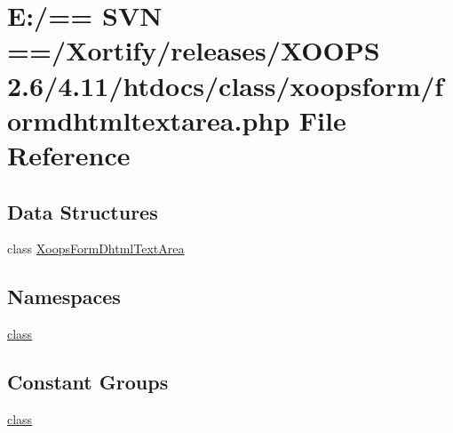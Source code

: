 \hypertarget{formdhtmltextarea_8php}{\section{E\-:/== S\-V\-N ==/\-Xortify/releases/\-X\-O\-O\-P\-S 2.6/4.11/htdocs/class/xoopsform/formdhtmltextarea.php File Reference}
\label{formdhtmltextarea_8php}
}
\subsection*{Data Structures}
\begin{DoxyCompactItemize}
\item 
class \hyperlink{class_xoops_form_dhtml_text_area}{Xoops\-Form\-Dhtml\-Text\-Area}
\end{DoxyCompactItemize}
\subsection*{Namespaces}
\begin{DoxyCompactItemize}
\item 
\hyperlink{namespaceclass}{class}
\end{DoxyCompactItemize}
\subsection*{Constant Groups}
\begin{DoxyCompactItemize}
\item 
\hyperlink{namespaceclass}{class}
\end{DoxyCompactItemize}
